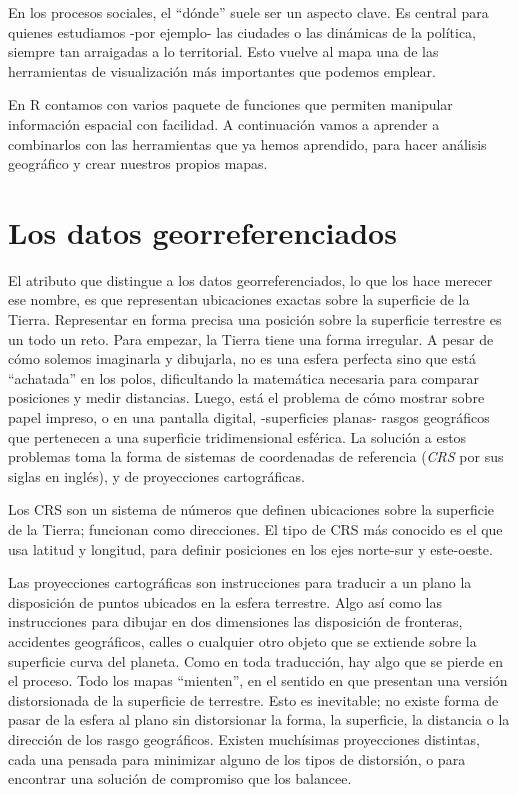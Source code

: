 \documentclass[spanish,]{book}
\begin{document}
En los procesos sociales, el ``dónde'' suele ser un aspecto clave. Es central para quienes estudiamos -por ejemplo- las ciudades o las dinámicas de la política, siempre tan arraigadas a lo territorial. Esto vuelve al mapa una de las herramientas de visualización más importantes que podemos emplear.

En R contamos con varios paquete de funciones que permiten manipular información espacial con facilidad. A continuación vamos a aprender a combinarlos con las herramientas que ya hemos aprendido, para hacer análisis geográfico y crear nuestros propios mapas.

\hypertarget{los-datos-georreferenciados}{%
\section{Los datos georreferenciados}\label{los-datos-georreferenciados}}

El atributo que distingue a los datos georreferenciados, lo que los hace merecer ese nombre, es que representan ubicaciones exactas sobre la superficie de la Tierra. Representar en forma precisa una posición sobre la superficie terrestre es un todo un reto. Para empezar, la Tierra tiene una forma irregular. A pesar de cómo solemos imaginarla y dibujarla, no es una esfera perfecta sino que está ``achatada'' en los polos, dificultando la matemática necesaria para comparar posiciones y medir distancias. Luego, está el problema de cómo mostrar sobre papel impreso, o en una pantalla digital, -superficies planas- rasgos geográficos que pertenecen a una superficie tridimensional esférica. La solución a estos problemas toma la forma de sistemas de coordenadas de referencia (\emph{CRS} por sus siglas en inglés), y de proyecciones cartográficas.

Los CRS son un sistema de números que definen ubicaciones sobre la superficie de la Tierra; funcionan como direcciones. El tipo de CRS más conocido es el que usa latitud y longitud, para definir posiciones en los ejes norte-sur y este-oeste.

Las proyecciones cartográficas son instrucciones para traducir a un plano la disposición de puntos ubicados en la esfera terrestre. Algo así como las instrucciones para dibujar en dos dimensiones las disposición de fronteras, accidentes geográficos, calles o cualquier otro objeto que se extiende sobre la superficie curva del planeta. Como en toda traducción, hay algo que se pierde en el proceso. Todo los mapas ``mienten'', en el sentido en que presentan una versión distorsionada de la superficie de terrestre. Esto es inevitable; no existe forma de pasar de la esfera al plano sin distorsionar la forma, la superficie, la distancia o la dirección de los rasgo geográficos. Existen muchísimas proyecciones distintas, cada una pensada para minimizar alguno de los tipos de distorsión, o para encontrar una solución de compromiso que los balancee.
\end{document}
